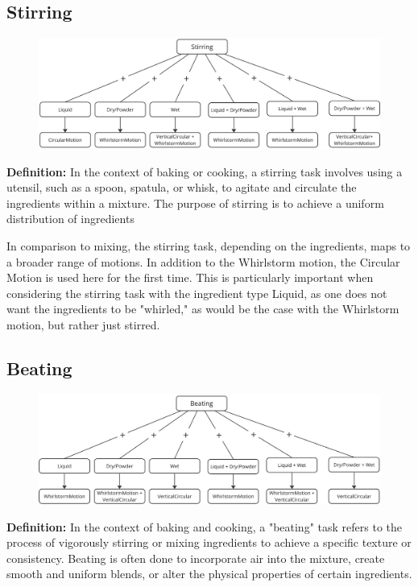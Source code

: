 \subsection*{Stirring}
\begin{figure}[H]
    \includegraphics[scale=0.18]{Graphics/StirringDeisionTree.jpg}
    \end{figure}
\textbf{Definition:}
In the context of baking or cooking, a stirring task involves using a utensil, such as a spoon, spatula, or whisk, to agitate and circulate the ingredients within a mixture. The purpose of stirring is to achieve a uniform distribution of ingredients

In comparison to mixing, the stirring task, depending on the ingredients, maps to a broader range of motions. In addition to the Whirlstorm motion, the Circular Motion is used here for the first time. This is particularly important when considering the stirring task with the ingredient type Liquid, as one does not want the ingredients to be "whirled," as would be the case with the Whirlstorm motion, but rather just stirred.
\subsection*{Beating}
\begin{figure}[H]
    \includegraphics[scale=0.18]{Graphics/BeatingDecisionTree.jpg}
    \end{figure}
\textbf{Definition:}
In the context of baking and cooking, a "beating" task refers to the process of vigorously stirring or mixing ingredients to achieve a specific texture or consistency. Beating is often done to incorporate air into the mixture, create smooth and uniform blends, or alter the physical properties of certain ingredients.

